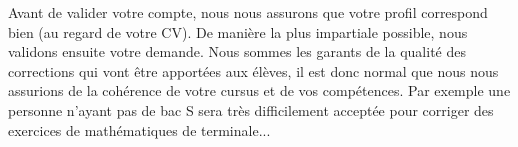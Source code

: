 ﻿Avant de valider votre compte, nous nous assurons que votre profil correspond bien (au regard de votre CV). De manière la plus impartiale possible, nous validons ensuite votre demande. Nous sommes les garants de la qualité des corrections qui vont être apportées aux élèves, il est donc normal que nous nous assurions de la cohérence de votre cursus et de vos compétences. Par exemple une personne n'ayant pas de bac S sera très difficilement acceptée pour corriger des exercices de mathématiques de terminale...